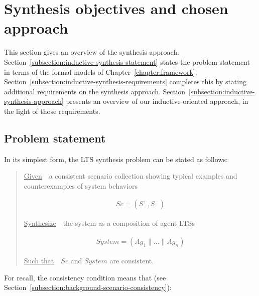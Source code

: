 \section{Synthesis objectives and chosen approach\label{section:inductive-overview}}

This section gives an overview of the synthesis approach. Section~\ref{subsection:inductive-synthesis-statement} states the problem statement in terms of the formal models of Chapter~\ref{chapter:framework}. Section~\ref{subsection:inductive-synthesis-requirements} completes this by stating additional requirements on the synthesis approach. Section~\ref{subsection:inductive-synthesis-approach} presents an overview of our inductive-oriented approach, in the light of those requirements.


\subsection{Problem statement\label{subsection:inductive-synthesis-statement}}

In its simplest form, the LTS synthesis problem can be stated as follows:

\begin{quotation}
\noindent \underline{Given}~~a consistent scenario collection showing typical examples and counterexamples of system behaviors

\vspace{-0.7cm}
\begin{align*}
Sc = (S^+,S^-)
\end{align*}

\vspace{-0.2cm}
\noindent \underline{Synthesize}~~the system as a composition of agent LTSs

\vspace{-0.7cm}
\begin{align*}
System = (Ag_1 \parallel \ldots \parallel Ag_n)
\end{align*}

\vspace{-0.2cm}
\noindent \underline{Such that}~~$Sc$ and $System$ are consistent.
\end{quotation}

\noindent For recall, the consistency condition means that (see Section~\ref{subsection:background-scenario-consistency}):

